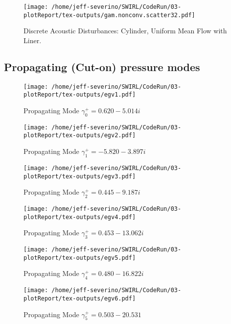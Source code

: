 \documentclass[a4paper]{article}
\begin{document}
 \begin{figure}
     \centering
     \texttt{[image: /home/jeff-severino/SWIRL/CodeRun/03-plotReport/tex-outputs/gam.nonconv.scatter32.pdf]}
     \caption{Discrete Acoustic Disturbances: Cylinder, Uniform Mean Flow with Liner.}
     \label{fig:1} 
 \end{figure}
 
 



\subsection{Propagating (Cut-on) pressure modes}

 \begin{figure}
     \centering
     \texttt{[image: /home/jeff-severino/SWIRL/CodeRun/03-plotReport/tex-outputs/egv1.pdf]}
     \caption{Propagating Mode $\gamma^+_0 = 0.620-5.014i$}
     \label{fig:2} 
 \end{figure}


 \begin{figure}
     \centering
     \texttt{[image: /home/jeff-severino/SWIRL/CodeRun/03-plotReport/tex-outputs/egv2.pdf]}
     \caption{Propagating Mode $\gamma^+_1 = -5.820-3.897i$}
     \label{fig:3} 
 \end{figure}


 \begin{figure}
     \centering
     \texttt{[image: /home/jeff-severino/SWIRL/CodeRun/03-plotReport/tex-outputs/egv3.pdf]}
     \caption{Propagating Mode $\gamma^+_2 = 0.445-9.187i$}
     \label{fig:4} 
 \end{figure}


 \begin{figure}
     \centering
     \texttt{[image: /home/jeff-severino/SWIRL/CodeRun/03-plotReport/tex-outputs/egv4.pdf]}
     \caption{Propagating Mode $\gamma^+_3 = 0.453-13.062i$}
     \label{fig:5} 
 \end{figure}


 \begin{figure}
     \centering
     \texttt{[image: /home/jeff-severino/SWIRL/CodeRun/03-plotReport/tex-outputs/egv5.pdf]}
     \caption{Propagating Mode $\gamma^+_4 = 0.480 - 16.822i$}
     \label{fig:6} 
 \end{figure}


 \begin{figure}
     \centering
     \texttt{[image: /home/jeff-severino/SWIRL/CodeRun/03-plotReport/tex-outputs/egv6.pdf]}
     \caption{Propagating Mode $\gamma^+_5 = 0.503 - 20.531$}
     \label{fig:7} 
 \end{figure}
\end{document}
